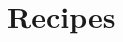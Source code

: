 \documentclass[main]{subfiles}
\begin{document}
\section{Recipes}

\secttoc

\newpage


\newpage



\end{document}
